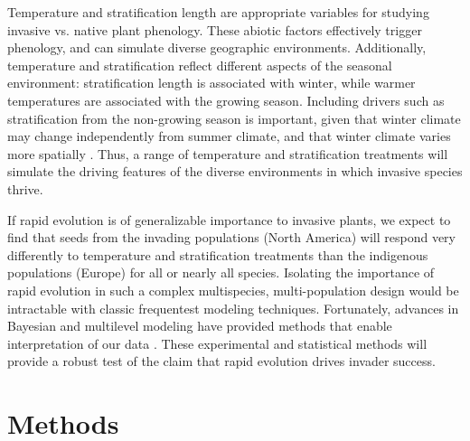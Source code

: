 \documentclass[12pt]{article}\usepackage[]{graphicx}\usepackage[]{color}
\begin{document}
	Temperature and stratification length are appropriate variables for studying invasive vs. native plant phenology. These abiotic factors effectively trigger phenology, and can simulate diverse geographic environments. Additionally, temperature and stratification reflect different aspects of the seasonal environment: stratification length is associated with winter, while warmer temperatures are associated with the growing season. Including drivers such as stratification from the non-growing season is important, given that winter climate may change independently from summer climate, and that winter climate varies more spatially \parencite{Bonan2003}. Thus, a range of temperature and stratification treatments will simulate the driving features of the diverse environments in which invasive species thrive. 
	
	 If rapid evolution is of generalizable importance to invasive plants, we expect to find that seeds from the invading populations (North America) will respond very differently to temperature and stratification treatments than the indigenous populations (Europe) for all or nearly all species. Isolating the importance of rapid evolution in such a complex multispecies, multi-population design would be intractable with classic frequentest modeling  techniques. Fortunately, advances in Bayesian and multilevel modeling have provided methods that enable interpretation of our data \parencite{Carpenter2017}.  These experimental and statistical methods will provide a robust test of the claim that rapid evolution drives invader success.
	 
	\section{Methods}
\end{document}
